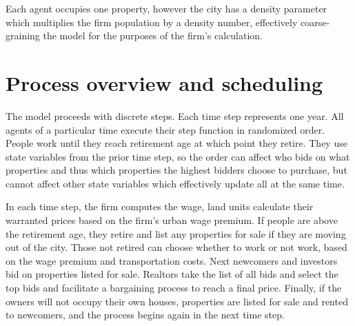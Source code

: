 Each agent occupies one property, however the city has a density parameter which multiplies the firm population by a density number, effectively coarse-graining the model for the purposes of the firm's calculation. 

 




\section{Process overview and scheduling}
The model proceeds with discrete steps. Each time step represents one year.  All agents of a particular time execute their step function in randomized order. People work until they reach retirement age at which point they retire. They use state variables from the prior time step, so the order can affect who bids on what properties and thus which properties the highest bidders choose to purchase, but cannot affect other state variables which effectively update all at the same time. %

In each time step, the firm computes the wage, land units calculate their warranted prices based on the firm's urban wage premium. If people are above the retirement age, they retire and list any properties for sale if they are moving out of the city. Those not retired can choose whether to work or not work, based on the wage premium and transportation costs. Next newcomers and investors bid on properties listed for sale. Realtors take the list of all bids and select the top bids and facilitate a bargaining process to reach a final price. Finally, if the owners will not occupy their own houses, properties are listed for sale and rented to newcomers, and the process begins again in the next time step. 



